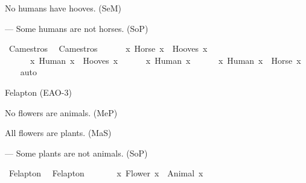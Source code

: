 \begin{isabellebody}
\begin{exercise}[subtitle=Silogizmi]
%
\begin{isamarkuptext}%
No humans have hooves. (SeM)%
\end{isamarkuptext}\isamarkuptrue%
%
\begin{isamarkuptext}%
— Some humans are not horses. (SoP)%
\end{isamarkuptext}\isamarkuptrue%
\isamarkupfalse%
\ Camestros{\isacharcolon}{\kern0pt}\ %
\isadelimproof
%
\endisadelimproof
%
\isatagproof
%
\endisatagproof
{\isafoldproof}%
%
\isadelimproof
\isanewline
%
\endisadelimproof
{}\isamarkupfalse%
\ Camestros{\isacharcolon}{\kern0pt}\ {\isachardoublequoteopen}\isanewline
\ \ \ \ {\isacharparenleft}{\kern0pt}{\isasymforall}\ x{\isachardot}{\kern0pt}\ Horse\ x\ {\isasymlongrightarrow}\ Hooves\ x{\isacharparenright}{\kern0pt}\ {\isasymand}\isanewline
\ \ \ \ {\isacharparenleft}{\kern0pt}{\isasymnot}\ {\isacharparenleft}{\kern0pt}{\isasymexists}\ x{\isachardot}{\kern0pt}\ Human\ x\ {\isasymand}\ Hooves\ x{\isacharparenright}{\kern0pt}{\isacharparenright}{\kern0pt}\ {\isasymand}\isanewline
\ \ \ \ {\isacharparenleft}{\kern0pt}{\isasymexists}\ x{\isachardot}{\kern0pt}\ Human\ x{\isacharparenright}{\kern0pt}\ {\isasymlongrightarrow}\isanewline
\ \ \ \ {\isacharparenleft}{\kern0pt}{\isasymexists}\ x{\isachardot}{\kern0pt}\ Human\ x\ {\isasymand}\ {\isasymnot}Horse\ x{\isacharparenright}{\kern0pt}{\isachardoublequoteclose}\isanewline
%
\isadelimproof
\ \ %
\endisadelimproof
%
\isatagproof
{}\isamarkupfalse%
\ auto%
\endisatagproof
{\isafoldproof}%
%
\isadelimproof
%
\endisadelimproof
%
\begin{isamarkuptext}%
Felapton (EAO-3)%
\end{isamarkuptext}\isamarkuptrue%
%
\begin{isamarkuptext}%
No flowers are animals. (MeP)%
\end{isamarkuptext}\isamarkuptrue%
%
\begin{isamarkuptext}%
All flowers are plants. (MaS)%
\end{isamarkuptext}\isamarkuptrue%
%
\begin{isamarkuptext}%
— Some plants are not animals. (SoP)%
\end{isamarkuptext}\isamarkuptrue%
\isamarkupfalse%
\ Felapton{\isacharcolon}{\kern0pt}\ %
\isadelimproof
%
\endisadelimproof
%
\isatagproof
%
\endisatagproof
{\isafoldproof}%
%
\isadelimproof
\isanewline
%
\endisadelimproof
{}\isamarkupfalse%
\ Felapton{\isacharcolon}{\kern0pt}\ {\isachardoublequoteopen}\isanewline
\ \ \ \ {\isacharparenleft}{\kern0pt}{\isasymnot}\ {\isacharparenleft}{\kern0pt}{\isasymexists}\ x{\isachardot}{\kern0pt}\ Flower\ x\ {\isasymand}\ Animal\ x{\isacharparenright}{\kern0pt}{\isacharparenright}{\kern0pt}\ {\isasymand}\isanewline

\end{exercise}
\end{isabellebody}

